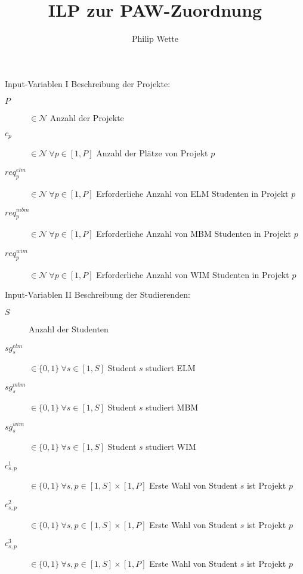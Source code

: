 \documentclass[11pt]{beamer}
\author{Philip Wette}
\title{ILP zur PAW-Zuordnung}
\begin{document}
\begin{frame}
\titlepage
\end{frame}


\begin{frame}{Input-Variablen I}
Beschreibung der Projekte:
\begin{description}
\item[$P$] $\in \mathcal{N}$ Anzahl der Projekte \\
\item[$c_p$] $\in \mathcal{N} ~ \forall p \in \left[1, P\right]$ Anzahl der Plätze von Projekt $p$ \\
\item[$req^{elm}_p$] $\in \mathcal{N} ~ \forall p \in \left[1, P\right]$ Erforderliche Anzahl von ELM Studenten in Projekt $p$ \\
\item[$req^{mbm}_p$] $\in \mathcal{N} ~ \forall p \in \left[1, P\right]$ Erforderliche Anzahl von MBM Studenten in Projekt $p$ \\
\item[$req^{wim}_p$] $\in \mathcal{N} ~ \forall p \in \left[1, P\right]$ Erforderliche Anzahl von WIM Studenten in Projekt $p$ \\
\end{description}
\end{frame}

\begin{frame}{Input-Variablen II}
Beschreibung der Studierenden:
\begin{description}
\item[$S$] Anzahl der Studenten \\
\item[$sg^{elm}_s$] $\in \{0, 1\} ~ \forall s \in \left[1, S\right]$ Student $s$ studiert ELM \\
\item[$sg^{mbm}_s$] $\in \{0, 1\} ~ \forall s \in \left[1, S\right]$ Student $s$ studiert MBM \\
\item[$sg^{wim}_s$] $\in \{0, 1\} ~ \forall s \in \left[1, S\right]$ Student $s$ studiert WIM \\
\item[$c^{1}_{s,p}$] $\in \{0, 1\} ~ \forall s,p \in \left[1, S\right] \times \left[1, P\right]$ Erste Wahl von Student $s$ ist Projekt $p$ \\
\item[$c^{2}_{s,p}$] $\in \{0, 1\} ~ \forall s,p \in \left[1, S\right] \times \left[1, P\right]$ Erste Wahl von Student $s$ ist Projekt $p$ \\
\item[$c^{3}_{s,p}$] $\in \{0, 1\} ~ \forall s,p \in \left[1, S\right] \times \left[1, P\right]$ Erste Wahl von Student $s$ ist Projekt $p$ \\
\end{description}
\end{frame}
\end{document}
